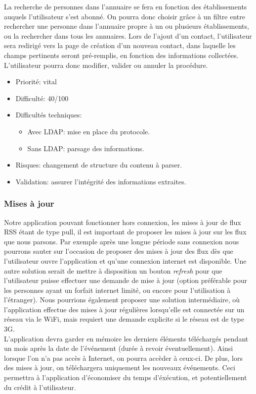 \documentclass [pdftex,12pt] {report}
\def\wl{\par \vspace{\baselineskip}}
\begin{document}
\wl La recherche de personnes dans l'annuaire se fera en fonction des établissements auquels l'utilisateur s'est abonné. On pourra donc choisir grâce à un filtre entre rechercher une personne dans l'annuaire propre à un ou plusieurs établissements, ou la rechercher dans tous les annuaires.
Lors de l'ajout d'un contact, l'utilisateur sera redirigé vers la page de création d'un nouveau contact, dans laquelle les champs pertinents seront pré-remplis, en fonction des informations collectées. L'utilisateur pourra donc modifier, valider ou annuler la procédure. \\

\begin{itemize}
\renewcommand{\labelitemi}{$\bullet$}
\item Priorité: vital
\item Difficulté: 40/100
\item Difficultés techniques:
\begin{itemize}
\item Avec LDAP: mise en place du protocole.
\item Sans LDAP: parsage des informations.
\end{itemize} 
\item Risques: changement de structure du contenu à parser.
\item Validation: assurer l'intégrité des informations extraites.
\end{itemize}

\subsubsection{Mises à jour}
Notre application pouvant fonctionner hors connexion, les mises à jour de flux RSS étant de type pull, il est important de proposer les mises à jour sur les flux que nous parsons. Par exemple après une longue période sans connexion nous pourrons sauter sur l'occasion de proposer des mises à jour des flux dès que l'utilisateur ouvre l'application et qu'une connexion internet est disponible. Une autre solution serait de mettre à disposition un bouton \emph{refresh} pour que l'utilisateur puisse effectuer une demande de mise à jour (option préférable pour les personnes ayant un forfait internet limité, ou encore pour l'utilisation à l'étranger). Nous pourrions également proposer une solution intermédiaire, où l'application effectue des mises à jour régulières lorsqu'elle est connectée sur un réseau via le WiFi, mais requiert une demande explicite si le réseau est de type 3G. \\
L'application devra garder en mémoire les derniers éléments téléchargés pendant un mois après la date de l'événement (durée à revoir éventuellement). Ainsi lorsque l'on n'a pas accès à Internet, on pourra accèder à ceux-ci. De plus, lors des mises à jour, on téléchargera uniquement les nouveaux événements. Ceci permettra à l'application d'économiser du temps d'éxécution, et potentiellement du crédit à l'utilisateur. \\
\end{document}
